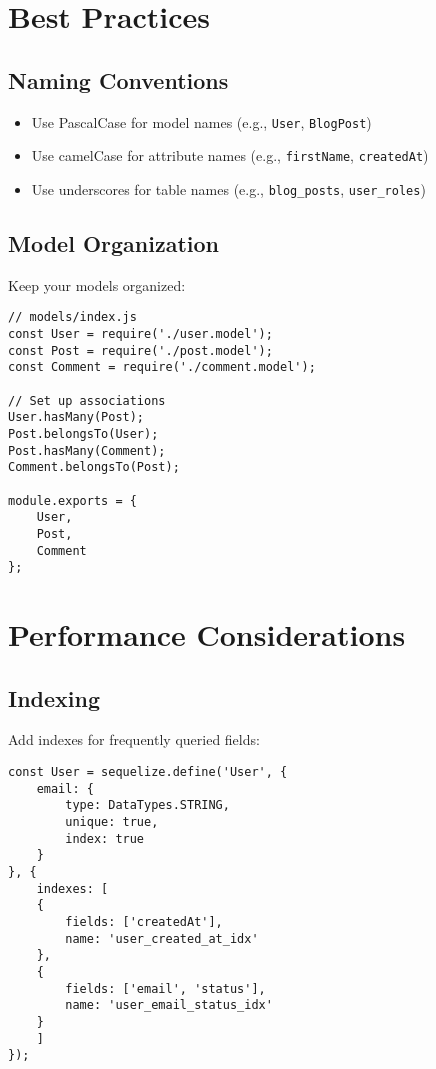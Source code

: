 \documentclass[12pt,a4paper]{book}
\begin{document}
	\section{Best Practices}
	
	\subsection{Naming Conventions}
	\begin{itemize}
		\item Use PascalCase for model names (e.g., \texttt{User}, \texttt{BlogPost})
		\item Use camelCase for attribute names (e.g., \texttt{firstName}, \texttt{createdAt})
		\item Use underscores for table names (e.g., \texttt{blog\_posts}, \texttt{user\_roles})
	\end{itemize}
	
	\subsection{Model Organization}
	Keep your models organized:
	
	\begin{verbatim}
// models/index.js
const User = require('./user.model');
const Post = require('./post.model');
const Comment = require('./comment.model');

// Set up associations
User.hasMany(Post);
Post.belongsTo(User);
Post.hasMany(Comment);
Comment.belongsTo(Post);

module.exports = {
	User,
	Post,
	Comment
};
	\end{verbatim}
	
	\section{Performance Considerations}
	
	\subsection{Indexing}
	Add indexes for frequently queried fields:
	
	\begin{verbatim}
const User = sequelize.define('User', {
	email: {
		type: DataTypes.STRING,
		unique: true,
		index: true
	}
}, {
	indexes: [
	{
		fields: ['createdAt'],
		name: 'user_created_at_idx'
	},
	{
		fields: ['email', 'status'],
		name: 'user_email_status_idx'
	}
	]
});
	\end{verbatim}
	
\end{document}
